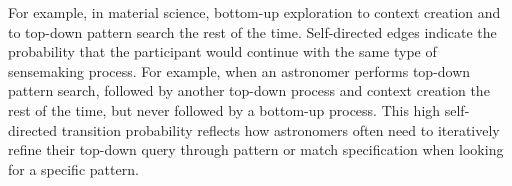  \par {} For example, in material science, bottom-up exploration  to context creation and to top-down pattern search the rest of the time. Self-directed edges indicate the probability that the participant
 would continue with the same type of sensemaking process. For example, when an astronomer performs top-down pattern search, followed by another top-down process and  context creation the rest of the time,
 but never followed by a bottom-up process.
 This high self-directed transition probability
 reflects how astronomers often need to iteratively
 refine their top-down query through pattern
 or match specification when looking for a specific pattern. %
